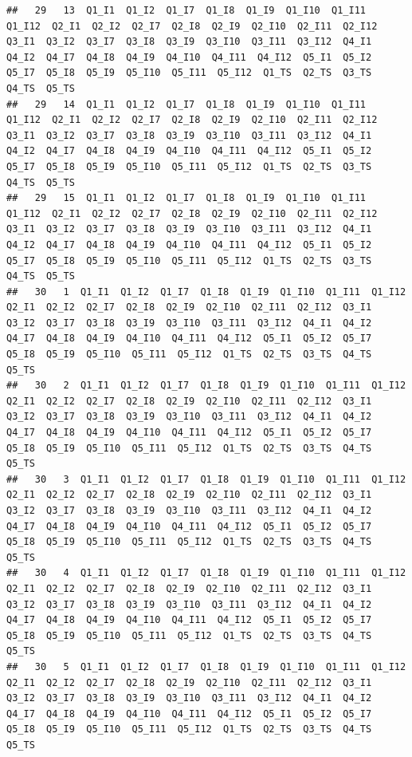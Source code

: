 \documentclass[]{book}
\begin{document}
\begin{verbatim}
##   29   13  Q1_I1  Q1_I2  Q1_I7  Q1_I8  Q1_I9  Q1_I10  Q1_I11  Q1_I12  Q2_I1  Q2_I2  Q2_I7  Q2_I8  Q2_I9  Q2_I10  Q2_I11  Q2_I12  Q3_I1  Q3_I2  Q3_I7  Q3_I8  Q3_I9  Q3_I10  Q3_I11  Q3_I12  Q4_I1  Q4_I2  Q4_I7  Q4_I8  Q4_I9  Q4_I10  Q4_I11  Q4_I12  Q5_I1  Q5_I2  Q5_I7  Q5_I8  Q5_I9  Q5_I10  Q5_I11  Q5_I12  Q1_TS  Q2_TS  Q3_TS  Q4_TS  Q5_TS
##   29   14  Q1_I1  Q1_I2  Q1_I7  Q1_I8  Q1_I9  Q1_I10  Q1_I11  Q1_I12  Q2_I1  Q2_I2  Q2_I7  Q2_I8  Q2_I9  Q2_I10  Q2_I11  Q2_I12  Q3_I1  Q3_I2  Q3_I7  Q3_I8  Q3_I9  Q3_I10  Q3_I11  Q3_I12  Q4_I1  Q4_I2  Q4_I7  Q4_I8  Q4_I9  Q4_I10  Q4_I11  Q4_I12  Q5_I1  Q5_I2  Q5_I7  Q5_I8  Q5_I9  Q5_I10  Q5_I11  Q5_I12  Q1_TS  Q2_TS  Q3_TS  Q4_TS  Q5_TS
##   29   15  Q1_I1  Q1_I2  Q1_I7  Q1_I8  Q1_I9  Q1_I10  Q1_I11  Q1_I12  Q2_I1  Q2_I2  Q2_I7  Q2_I8  Q2_I9  Q2_I10  Q2_I11  Q2_I12  Q3_I1  Q3_I2  Q3_I7  Q3_I8  Q3_I9  Q3_I10  Q3_I11  Q3_I12  Q4_I1  Q4_I2  Q4_I7  Q4_I8  Q4_I9  Q4_I10  Q4_I11  Q4_I12  Q5_I1  Q5_I2  Q5_I7  Q5_I8  Q5_I9  Q5_I10  Q5_I11  Q5_I12  Q1_TS  Q2_TS  Q3_TS  Q4_TS  Q5_TS
##   30   1  Q1_I1  Q1_I2  Q1_I7  Q1_I8  Q1_I9  Q1_I10  Q1_I11  Q1_I12  Q2_I1  Q2_I2  Q2_I7  Q2_I8  Q2_I9  Q2_I10  Q2_I11  Q2_I12  Q3_I1  Q3_I2  Q3_I7  Q3_I8  Q3_I9  Q3_I10  Q3_I11  Q3_I12  Q4_I1  Q4_I2  Q4_I7  Q4_I8  Q4_I9  Q4_I10  Q4_I11  Q4_I12  Q5_I1  Q5_I2  Q5_I7  Q5_I8  Q5_I9  Q5_I10  Q5_I11  Q5_I12  Q1_TS  Q2_TS  Q3_TS  Q4_TS  Q5_TS
##   30   2  Q1_I1  Q1_I2  Q1_I7  Q1_I8  Q1_I9  Q1_I10  Q1_I11  Q1_I12  Q2_I1  Q2_I2  Q2_I7  Q2_I8  Q2_I9  Q2_I10  Q2_I11  Q2_I12  Q3_I1  Q3_I2  Q3_I7  Q3_I8  Q3_I9  Q3_I10  Q3_I11  Q3_I12  Q4_I1  Q4_I2  Q4_I7  Q4_I8  Q4_I9  Q4_I10  Q4_I11  Q4_I12  Q5_I1  Q5_I2  Q5_I7  Q5_I8  Q5_I9  Q5_I10  Q5_I11  Q5_I12  Q1_TS  Q2_TS  Q3_TS  Q4_TS  Q5_TS
##   30   3  Q1_I1  Q1_I2  Q1_I7  Q1_I8  Q1_I9  Q1_I10  Q1_I11  Q1_I12  Q2_I1  Q2_I2  Q2_I7  Q2_I8  Q2_I9  Q2_I10  Q2_I11  Q2_I12  Q3_I1  Q3_I2  Q3_I7  Q3_I8  Q3_I9  Q3_I10  Q3_I11  Q3_I12  Q4_I1  Q4_I2  Q4_I7  Q4_I8  Q4_I9  Q4_I10  Q4_I11  Q4_I12  Q5_I1  Q5_I2  Q5_I7  Q5_I8  Q5_I9  Q5_I10  Q5_I11  Q5_I12  Q1_TS  Q2_TS  Q3_TS  Q4_TS  Q5_TS
##   30   4  Q1_I1  Q1_I2  Q1_I7  Q1_I8  Q1_I9  Q1_I10  Q1_I11  Q1_I12  Q2_I1  Q2_I2  Q2_I7  Q2_I8  Q2_I9  Q2_I10  Q2_I11  Q2_I12  Q3_I1  Q3_I2  Q3_I7  Q3_I8  Q3_I9  Q3_I10  Q3_I11  Q3_I12  Q4_I1  Q4_I2  Q4_I7  Q4_I8  Q4_I9  Q4_I10  Q4_I11  Q4_I12  Q5_I1  Q5_I2  Q5_I7  Q5_I8  Q5_I9  Q5_I10  Q5_I11  Q5_I12  Q1_TS  Q2_TS  Q3_TS  Q4_TS  Q5_TS
##   30   5  Q1_I1  Q1_I2  Q1_I7  Q1_I8  Q1_I9  Q1_I10  Q1_I11  Q1_I12  Q2_I1  Q2_I2  Q2_I7  Q2_I8  Q2_I9  Q2_I10  Q2_I11  Q2_I12  Q3_I1  Q3_I2  Q3_I7  Q3_I8  Q3_I9  Q3_I10  Q3_I11  Q3_I12  Q4_I1  Q4_I2  Q4_I7  Q4_I8  Q4_I9  Q4_I10  Q4_I11  Q4_I12  Q5_I1  Q5_I2  Q5_I7  Q5_I8  Q5_I9  Q5_I10  Q5_I11  Q5_I12  Q1_TS  Q2_TS  Q3_TS  Q4_TS  Q5_TS

\end{verbatim}
\end{document}
